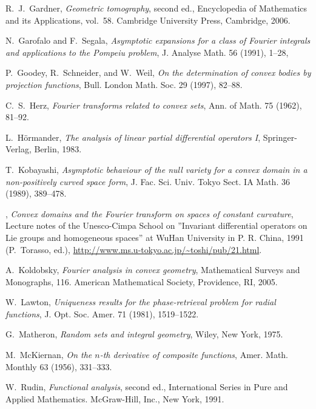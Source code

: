 \documentclass[a4paper]{amsart}
\theoremstyle{definition}
\numberwithin{equation}{section}
\begin{document}
\begin{thebibliography}{Bia09a}
 R.~J.~Gardner, \emph{Geometric tomography}, second ed., Encyclopedia of Mathematics and its Applications, vol.~58. Cambridge University Press, Cambridge, 2006.

  N.~Garofalo and F.~Segala, \emph{Asymptotic expansions for a class of Fourier integrals and applications to the Pompeiu problem}, J. Analyse Math. {56} (1991), {1--28},

 P.~Goodey, R.~Schneider, and W.~Weil,  \emph{On the determination of convex bodies by projection functions}, Bull. London Math. Soc. {29} (1997), 82--88.

 C.~S.~Herz, \emph{Fourier transforms related to convex sets}, Ann. of Math. {75} (1962), 81--92.

 L.~H\"{o}rmander, \emph{The analysis of linear partial differential operators I}, Springer-Verlag, Berlin, 1983.
 
 T.~Kobayashi, \emph{Asymptotic behaviour of the null variety for a convex domain in a non-positively curved space form}, J. Fac. Sci. Univ. Tokyo Sect. IA Math. 36 (1989), 389--478. 

 \bysame, \emph{Convex domains and the Fourier transform on spaces of constant curvature}, Lecture notes of the Unesco-Cimpa School on ''Invariant differential operators on Lie groups and homogeneous spaces''  at WuHan University in P. R. China, 1991 (P.~Torasso, ed.), \url{http://www.ms.u-tokyo.ac.jp/~toshi/pub/21.html}.

 A.~Koldobsky, \emph{Fourier analysis in convex geometry}, Mathematical Surveys and Monographs, 116. American Mathematical Society, Providence, RI, 2005.

  W.~Lawton, \emph{Uniqueness results for the phase-retrieval problem for radial functions}, J. Opt. Soc. Amer. 71 (1981), 1519--1522.

 G.~Matheron, \emph{Random sets and integral geometry}, Wiley, New York, 1975.

 M.~McKiernan, \emph{On the $n$-th derivative of composite functions}, Amer. Math. Monthly 63 (1956), 331--333.

 W.~Rudin, \emph{Functional analysis},  second ed., International Series in Pure and Applied Mathematics. McGraw-Hill, Inc., New York, 1991.


\end{thebibliography}
\end{document}
